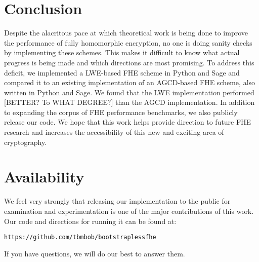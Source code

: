 \documentclass[letterpaper,twocolumn,10pt]{article}
\begin{document}
\section{Conclusion}
Despite the alacritous pace at which theoretical work is being done to improve the performance of fully homomorphic encryption, no one is doing sanity checks by implementing these schemes. This makes it difficult to know what actual progress is being made and which directions are most promising. To address this deficit, we implemented a LWE-based FHE scheme in Python and Sage and compared it to an existing implementation of an AGCD-based FHE scheme, also written in Python and Sage. We found that the LWE implementation performed [BETTER? To WHAT DEGREE?] than the AGCD implementation. In addition to expanding the corpus of FHE performance benchmarks, we also publicly release our code. We hope that this work helps provide direction to future FHE research and increases the accessibility of this new and exciting area of cryptography.


\section{Availability}
We feel very strongly that releasing our implementation to the public for examination and experimentation is one of the major contributions of this work. Our code and directions for running it can be found at:

\begin{center}
{\tt https://github.com/tbmbob/bootstraplessfhe}\\
\end{center}

If you have questions, we will do our best to answer them.
\end{document}
